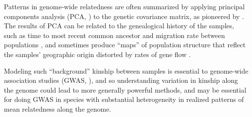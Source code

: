 \documentclass[11pt, oneside]{article}   	%
\newcommand\citet{\cite}
\newcommand\citep{\cite}
\begin{document}
Patterns in genome-wide relatedness are often summarized
by applying principal components analysis (PCA, \citet{patterson2006population}) 
to the genetic covariance matrix,
as pioneered by \citet{menozzi1978synthetic}.
The results of PCA can be related to the genealogical history of the samples, 
such as time to most recent common ancestor and migration rate between populations \citep{novembre2008interpreting,mcvean2009genealogical}, 
and sometimes produce ``maps'' of population structure
that reflect the samples' geographic origin distorted by rates of gene flow
\citep{novembre2008genes}.

Modeling such ``background'' kinship between samples
is essential to genome-wide association studies (GWAS, \citet{price2006principal,astle2009population}),
and so understanding variation in kinship along the genome 
could lead to more generally powerful methods,
and may be essential for doing GWAS in species with substantial heterogeneity in realized patterns of mean relatedness along the genome.
\end{document}
